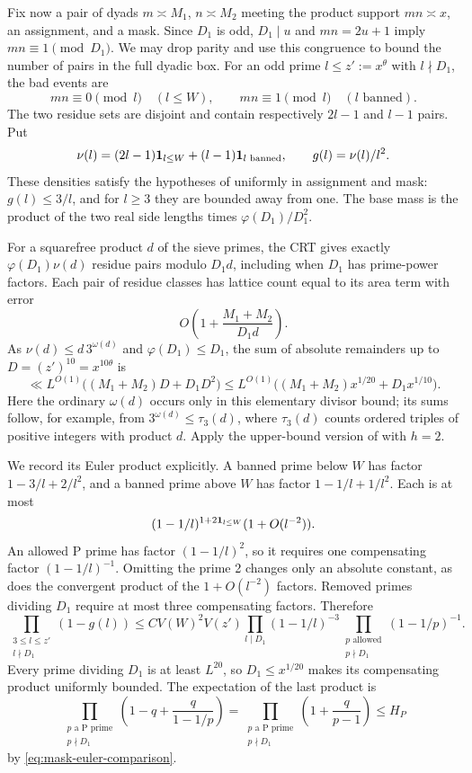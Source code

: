 Fix now a pair of dyads $m\asymp M_1$, $n\asymp M_2$ meeting
the product support $mn\asymp x$, an assignment, and a mask.
Since $D_1$ is odd, $D_1\mid u$ and $mn=2u+1$ imply
$mn\equiv1\pmod{D_1}$. We may drop parity and use this congruence
to bound the number of pairs in the full dyadic box. For an odd
prime $l\le z':=x^\theta$ with $l\nmid D_1$, the bad events are
\[
 mn\equiv0\pmod l\quad(l\le W),\qquad
 mn\equiv1\pmod l\quad(l\text{ banned}).
\]
The two residue sets are disjoint and contain respectively
$2l-1$ and $l-1$ pairs. Put
\[
 \nu(l)=(2l-1)\mathbf 1_{l\le W}+(l-1)\mathbf 1_{l\text{ banned}},
 \qquad g(l)=\nu(l)/l^2.
\]
These densities satisfy the hypotheses of 
uniformly in assignment and mask: $g(l)\le3/l$, and for $l\ge3$
they are bounded away from one. The base mass is the product
of the two real side lengths times $\varphi(D_1)/D_1^2$.

For a squarefree product $d$ of the sieve primes, the CRT gives
exactly $\varphi(D_1)\nu(d)$ residue pairs modulo $D_1d$, including
when $D_1$ has prime-power factors. Each pair of residue classes
has lattice count equal to its area term with error
\[
 O\left(1+\frac{M_1+M_2}{D_1d}\right).
\]
As $\nu(d)\le d\,3^{\omega(d)}$ and $\varphi(D_1)\le D_1$, the
sum of absolute remainders up to $D=(z')^{10}=x^{10\theta}$ is
\begin{equation}\label{eq:pair-lattice-error}
 \ll L^{O(1)}\bigl((M_1+M_2)D+D_1D^2\bigr)
 \le L^{O(1)}\bigl((M_1+M_2)x^{1/20}+D_1x^{1/10}\bigr).
\end{equation}
Here the ordinary $\omega(d)$ occurs only in this elementary
divisor bound; its sums follow, for example, from
$3^{\omega(d)}\le\tau_3(d)$, where $\tau_3(d)$ counts ordered triples
of positive integers with product $d$. Apply the upper-bound version of
 with $h=2$.

We record its Euler product explicitly. A banned prime below $W$
has factor $1-3/l+2/l^2$, and a banned prime above $W$ has
factor $1-1/l+1/l^2$. Each is at most
\[
 (1-1/l)^{1+2\mathbf 1_{l\le W}}(1+O(l^{-2})).
\]
An allowed P prime has factor $(1-1/l)^2$, so it requires one
compensating factor $(1-1/l)^{-1}$. Omitting the prime 2 changes
only an absolute constant, as does the convergent product of
the $1+O(l^{-2})$ factors. Removed primes dividing $D_1$ require
at most three compensating factors. Therefore
\begin{equation}\label{eq:pair-sieve-product}
 \prod_{\substack{3\le l\le z'\\l\nmid D_1}}(1-g(l))
 \le C V(W)^2V(z')
       \prod_{l\mid D_1}(1-1/l)^{-3}
       \prod_{\substack{p\text{ allowed}\\p\nmid D_1}}(1-1/p)^{-1}.
\end{equation}
Every prime dividing $D_1$ is at least $L^{20}$, so
$D_1\le x^{1/20}$ makes its compensating product uniformly
bounded. The expectation of the last product is
\[
 \prod_{\substack{p\text{ a P prime}\\p\nmid D_1}}
       \left(1-q+\frac q{1-1/p}\right)
 =\prod_{\substack{p\text{ a P prime}\\p\nmid D_1}}
       \left(1+\frac q{p-1}\right)\le H_P
\]
by \eqref{eq:mask-euler-comparison}.

